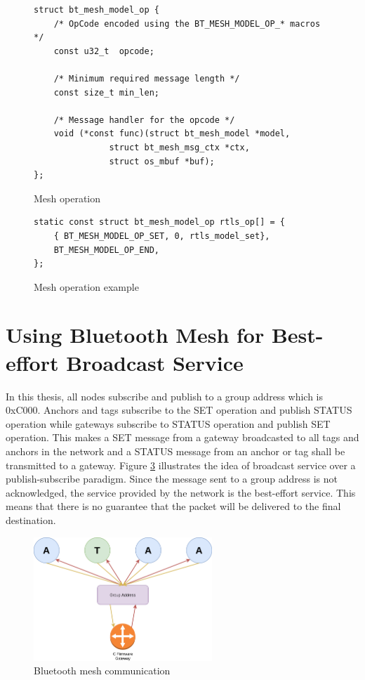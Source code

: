 \documentclass[\main/main.tex]{subfiles}
\begin{document}
\begin{figure}[H]
    \begin{lstlisting}[style=CStyle]
struct bt_mesh_model_op {
	/* OpCode encoded using the BT_MESH_MODEL_OP_* macros */
	const u32_t  opcode;

	/* Minimum required message length */
	const size_t min_len;

	/* Message handler for the opcode */
	void (*const func)(struct bt_mesh_model *model,
			   struct bt_mesh_msg_ctx *ctx,
			   struct os_mbuf *buf);
};
    \end{lstlisting}
    \caption{Mesh operation}
    \label{fig:mesh_model_operation}
\end{figure}

\begin{figure}[H]
    \begin{lstlisting}[style=CStyle]
static const struct bt_mesh_model_op rtls_op[] = {
    { BT_MESH_MODEL_OP_SET, 0, rtls_model_set},
    BT_MESH_MODEL_OP_END,
};
\end{lstlisting}
\caption{Mesh operation example}
\label{fig:mesh_model_operation_example}
\end{figure}

\section{Using Bluetooth Mesh for Best-effort Broadcast Service}
\label{sec:using_bluetooth_mesh_for_best_effort_broadcast_service}
In this thesis, all nodes subscribe and publish to a group address which is 0xC000. Anchors and tags subscribe to the SET operation and publish STATUS operation while gateways subscribe to STATUS operation and publish SET operation. This makes a SET message from a gateway broadcasted to all tags and anchors in the network and a STATUS message from an anchor or tag shall be transmitted to a gateway. Figure \ref{fig:ble_mesh_comunication} illustrates the idea of broadcast service over a publish-subscribe paradigm. Since the message sent to a group address is not acknowledged, the service provided by the network is the best-effort service. This means that there is no guarantee that the packet will be delivered to the final destination. 

\begin{figure}[H]
    \begin{center}
        \includegraphics[width=0.6\textwidth]{ble_mesh_comunication.png}
    \end{center}
    \caption{Bluetooth mesh communication}
    \label{fig:ble_mesh_comunication}
\end{figure}
\end{document}
